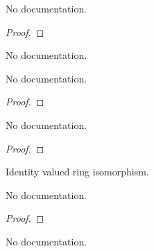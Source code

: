 \begin{theorem}\label{ValAlgHom.id_apply}
        \leanok
                No documentation.
    \end{theorem}

\begin{proof}
    \leanok
\end{proof}

\begin{definition}\label{ValRingHom.comp}
        \leanok
                No documentation.
    \end{definition}

\begin{theorem}\label{ValAlgHom.id_comp}
        \leanok
                No documentation.
    \end{theorem}

\begin{proof}
    \leanok
\end{proof}

\begin{theorem}\label{ValAlgHom.comp_id}
        \leanok
                No documentation.
    \end{theorem}

\begin{proof}
    \leanok
\end{proof}

\begin{definition}\label{ValAlgEquiv.refl}
        \leanok
                Identity valued ring isomorphism.
    \end{definition}

\begin{theorem}\label{ValAlgEquiv.coe_refl}
        \leanok
                No documentation.
    \end{theorem}

\begin{proof}
    \leanok
\end{proof}

\begin{theorem}\label{ValRingEquiv.refl_apply}
        \leanok
                No documentation.
    \end{theorem}

